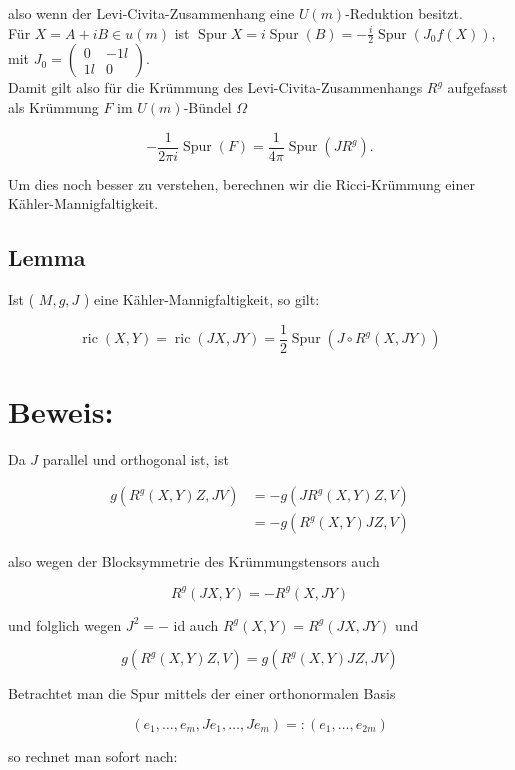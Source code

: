 \documentclass[10pt, letterpaper]{article}
\begin{document}
also wenn der Levi-Civita-Zusammenhang eine $U(m)$-Reduktion besitzt.\\
Für $X=A+i B \in u(m)$ ist $\operatorname{Spur} X=i \operatorname{Spur}(B)=-\frac{i}{2} \operatorname{Spur}\left(J_{0} f(X)\right)$, mit $J_{0}=\left(\begin{array}{cc}0 & -1 l \\ 1 l & 0\end{array}\right)$.\\
Damit gilt also für die Krümmung des Levi-Civita-Zusammenhangs $R^{g}$ aufgefasst als Krümmung $F$ im $U(m)$-Bündel $\Omega$

$$
-\frac{1}{2 \pi i} \operatorname{Spur}(F)=\frac{1}{4 \pi} \operatorname{Spur}\left(J R^{g}\right) .
$$

Um dies noch besser zu verstehen, berechnen wir die Ricci-Krümmung einer Kähler-Mannigfaltigkeit.

\subsection*{Lemma}
Ist ( $M, g, J$ ) eine Kähler-Mannigfaltigkeit, so gilt:

$$
\operatorname{ric}(X, Y)=\operatorname{ric}(J X, J Y)=\frac{1}{2} \operatorname{Spur}\left(J \circ R^{g}(X, J Y)\right)
$$

\section*{Beweis:}
Da $J$ parallel und orthogonal ist, ist

$$
\begin{aligned}
g\left(R^{g}(X, Y) Z, J V\right) & =-g\left(J R^{g}(X, Y) Z, V\right) \\
& =-g\left(R^{g}(X, Y) J Z, V\right)
\end{aligned}
$$

also wegen der Blocksymmetrie des Krümmungstensors auch

$$
R^{g}(J X, Y)=-R^{g}(X, J Y)
$$

und folglich wegen $J^{2}=-$ id auch $R^{g}(X, Y)=R^{g}(J X, J Y)$ und

$$
g\left(R^{g}(X, Y) Z, V\right)=g\left(R^{g}(X, Y) J Z, J V\right)
$$

Betrachtet man die Spur mittels der einer orthonormalen Basis

$$
\left(e_{1}, \ldots, e_{m}, J e_{1}, \ldots, J e_{m}\right)=:\left(e_{1}, \ldots, e_{2 m}\right)
$$

so rechnet man sofort nach:
\end{document}
